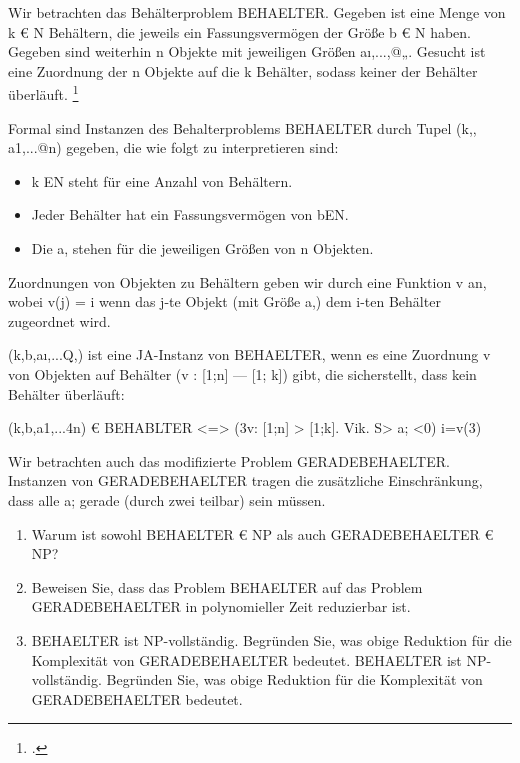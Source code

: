 \documentclass{bschlangaul-aufgabe}
\begin{document}

Wir betrachten das Behälterproblem BEHAELTER. Gegeben ist eine Menge von
k € N Behältern, die jeweils ein Fassungsvermögen der Größe b € N haben.
Gegeben sind weiterhin n Objekte mit jeweiligen Größen aı,...,@„.
Gesucht ist eine Zuordnung der n Objekte auf die k Behälter, sodass
keiner der Behälter überläuft.
\footcite{examen:66115:2019:03}

Formal sind Instanzen des Behalterproblems BEHAELTER durch Tupel (k,,
a1,...@n) gegeben, die wie folgt zu interpretieren sind:

\begin{itemize}
\item k EN steht für eine Anzahl von Behältern.

\item Jeder Behälter hat ein Fassungsvermögen von bEN.

\item  Die a, stehen für die jeweiligen Größen von n Objekten.
\end{itemize}

Zuordnungen von Objekten zu Behältern geben wir durch eine Funktion v
an, wobei v(j) = i wenn das j-te Objekt (mit Größe a,) dem i-ten
Behälter zugeordnet wird.

(k,b,aı,...Q,) ist eine JA-Instanz von BEHAELTER, wenn es eine Zuordnung
v von Objekten auf Behälter (v : [1;n] — [1; k]) gibt, die sicherstellt,
dass kein Behälter überläuft:

(k,b,a1,...4n) € BEHABLTER <=> (3v: [1;n] > [1;k]. Vik. S> a; <0)
i=v(3)

Wir betrachten auch das modifizierte Problem GERADEBEHAELTER. Instanzen
von GERADEBEHAELTER tragen die zusätzliche Einschränkung, dass alle a;
gerade (durch zwei teilbar) sein müssen.

\begin{enumerate}


\item Warum ist sowohl BEHAELTER € NP als auch GERADEBEHAELTER € NP?


\item Beweisen Sie, dass das Problem BEHAELTER auf das Problem
GERADEBEHAELTER in polynomieller Zeit reduzierbar ist.


\item BEHAELTER ist NP-vollständig. Begründen Sie, was obige Reduktion
für die Komplexität von GERADEBEHAELTER bedeutet. BEHAELTER ist
NP-vollständig. Begründen Sie, was obige Reduktion für die Komplexität
von GERADEBEHAELTER bedeutet.

\end{enumerate}
\end{document}
